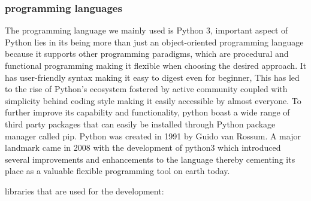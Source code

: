 \subsubsection{programming languages}
The programming language we mainly used is Python 3, important aspect of Python lies in its being more than just an object-oriented programming language because it supports other programming paradigms, which are procedural and functional programming making it flexible when choosing the desired approach. It has user-friendly syntax making it easy to digest even for beginner, This has led to the rise of Python's ecosystem fostered by active community coupled with simplicity behind coding style making it easily accessible by almost everyone. To further improve its capability and functionality, python boast a wide range of third party packages that can easily be installed through Python package manager called pip. Python was created in 1991 by Guido van Rossum. A major landmark came in 2008 with the development of python3 which introduced several improvements and enhancements to the language thereby cementing its place as a valuable flexible programming tool on earth today. \cite{python}

libraries that are used for the development:

